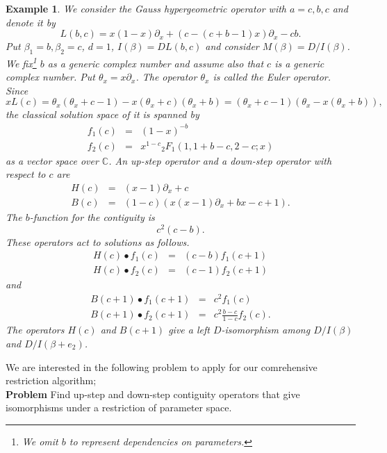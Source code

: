 \documentclass{article}
\def\CC{\mathbb{C}}
\def\pd#1{\partial_{#1}}
\newtheorem{example}{Example}
\begin{document}
\begin{example}\rm
We consider the Gauss hypergeometric operator
with $a=c, b, c$
and denote it by
\begin{equation}
L(b,c)=x(1-x)\pd{x}+(c-(c+b-1)x)\pd{x}-c b.
\end{equation}
Put $\beta_1=b, \beta_2=c$, $d=1$, 
$I(\beta)=DL(b,c)$ and
consider $M(\beta)=D/I(\beta)$.
We fix\footnote{We omit $b$ to represent dependencies on parameters.}  $b$
as a generic complex number
and assume also that $c$ is a generic complex number.
Put $\theta_x = x \pd{x}$. 
The operator $\theta_x$ is called the Euler operator.
Since
$$ x L(c) = \theta_x(\theta_x+c-1)-x (\theta_x+c)(\theta_x+b)
  = (\theta_x+c-1) (\theta_x - x (\theta_x+b)),
$$
the classical solution space of it is spanned by
\begin{eqnarray*}
f_1(c) &=& (1-x)^{-b} \\
f_2(c) &=& x^{1-c} {}_2F_1(1,1+b-c,2-c;x)
\end{eqnarray*}
as a vector space over $\CC$.
An up-step operator and a down-step operator with respect to $c$ are
\begin{eqnarray}
H(c) &=& (x-1)\pd{x}+c \\
B(c) &=& (1-c)\left( x (x-1) \pd{x} + b x - c + 1\right). 
\end{eqnarray}
The $b$-function for the contiguity is 
\begin{equation}
c^2 (c-b). %
\end{equation}
These operators act to solutions as follows.
\begin{eqnarray}
H(c) \bullet f_1(c) &=& (c-b) f_1(c+1) \\
H(c) \bullet f_2(c) &=& (c-1) f_2(c+1) 
\end{eqnarray}
and
\begin{eqnarray}
B(c+1) \bullet f_1(c+1) &=& c^2 f_1(c) \\
B(c+1) \bullet f_2(c+1) &=& c^2\frac{b-c}{1-c} f_2(c).
\end{eqnarray}
The operators $H(c)$ and $B(c+1)$ give 
a left $D$-isomorphism among
$D/I(\beta)$ and $D/I(\beta+e_2)$.
\end{example}

We are interested in the following problem
to apply for our comrehensive restriction algorithm;\\
{\bf Problem} Find up-step and down-step
contiguity operators that give isomorphisms
under a restriction of parameter space.
\end{document}
